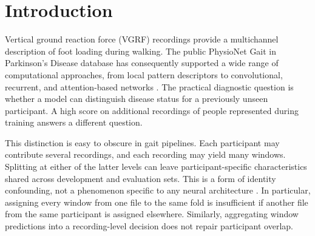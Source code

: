 \begin{abstract}
Gait-based Parkinson's disease classification is often evaluated using many windows derived from relatively few participants. Separating windows or recordings does not necessarily separate people, making the evaluation unit central to the interpretation of reported performance. We examine this problem through a compact Mamba classifier and an implementation audit of two published gait-learning systems. The documented classifier uses two selective state-space blocks of width 128, with approximately 0.275 million parameters. Its existing validation report records 88.61\% accuracy and 88.52\% macro-F1; preserved recurrent reports record 87.18\% and 84.36\% accuracy for LSTM and GRU, respectively. The original Mamba loss plot is smoother than the corresponding LSTM plot, although different optimization settings preclude attributing the difference solely to architecture. Independently, a filename-level audit shows that the two released implementations construct folds from recording boundaries rather than participant groups. A deterministic control-branch replay produces participant overlap without training either model. We distinguish this reproducible implementation finding from the exploratory model results: the latter use a single development split, have unequal evaluated sample counts, and retain unresolved run-provenance discrepancies. The study motivates participant-disjoint evaluation and compact selective state-space baselines, without claiming state-of-the-art performance, universal stability, or clinical validity.
\end{abstract}

\section{Introduction}
\label{sec:intro}
Vertical ground reaction force (VGRF) recordings provide a multichannel description of foot loading during walking. The public PhysioNet Gait in Parkinson's Disease database has consequently supported a wide range of computational approaches, from local pattern descriptors to convolutional, recurrent, and attention-based networks \citep{hausdorff2008,ertugrul2016,zhao2018,elmaachi2020,nguyen2022,naimi2024}. The practical diagnostic question is whether a model can distinguish disease status for a previously unseen participant. A high score on additional recordings of people represented during training answers a different question.

This distinction is easy to obscure in gait pipelines. Each participant may contribute several recordings, and each recording may yield many windows. Splitting at either of the latter levels can leave participant-specific characteristics shared across development and evaluation sets. This is a form of identity confounding, not a phenomenon specific to any neural architecture \citep{saeb2017,chaibub2019}. In particular, assigning every window from one file to the same fold is insufficient if another file from the same participant is assigned elsewhere. Similarly, aggregating window predictions into a recording-level decision does not repair participant overlap.

